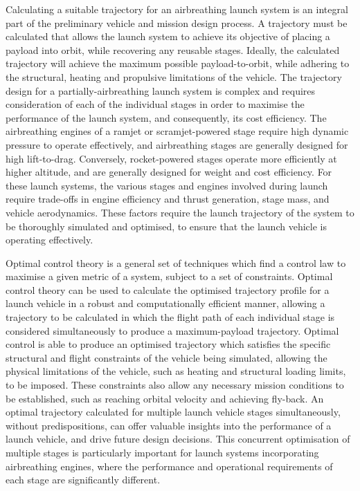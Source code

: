   	 Calculating a suitable trajectory for an airbreathing launch system is an integral part of the preliminary vehicle and mission design process. 
  	 A trajectory must be calculated that allows the launch system to achieve its objective of placing a payload into orbit, while recovering any reusable stages.
  	 Ideally, the calculated trajectory will achieve the maximum possible payload-to-orbit, while adhering to the structural, heating and propulsive limitations of the vehicle.  
  	 The trajectory design for a partially-airbreathing launch system is complex and requires consideration of each of the individual stages in order to maximise the performance of the launch system, and consequently, its cost efficiency. 
  	   The airbreathing engines of a ramjet or scramjet-powered stage require high dynamic pressure to operate effectively, and airbreathing stages are generally designed for high lift-to-drag. Conversely, rocket-powered stages operate more efficiently at higher altitude, and are generally designed for weight and cost efficiency. For these launch systems, the various stages and engines involved during launch require trade-offs in engine efficiency and thrust generation, stage mass, and vehicle aerodynamics. These factors require the launch trajectory of the system to be thoroughly simulated and optimised, to ensure that the launch vehicle is operating effectively. 
  
    Optimal control theory is a general set of techniques which find a control law to maximise a given metric of a system, subject to a set of constraints\cite{Rao2009,Betts1998}. 
    Optimal control theory can be used to calculate the optimised trajectory profile for a launch vehicle in a robust and computationally efficient manner, allowing a trajectory to be calculated in which the flight path of each individual stage is considered simultaneously to produce a maximum-payload trajectory\cite{Betts1998}. 
  Optimal control is able to produce an optimised trajectory which satisfies the specific structural and flight constraints of the vehicle being simulated, allowing the physical limitations of the vehicle, such as heating and structural loading limits, to be imposed\cite{Betts1998}. These constraints also allow any necessary mission conditions to be established, such as reaching orbital velocity and achieving fly-back. 
  An optimal trajectory calculated for multiple launch vehicle stages simultaneously, without predispositions, can offer valuable insights into the performance of a launch vehicle, and drive future design decisions. 
  This concurrent optimisation of multiple stages is particularly important for launch systems incorporating airbreathing engines, where the performance and operational requirements of each stage are significantly different.  
  



